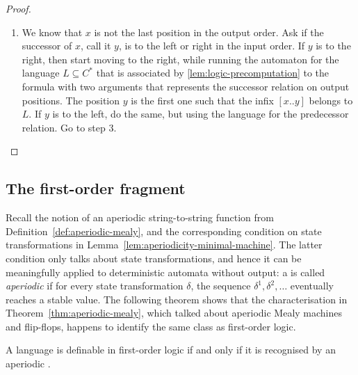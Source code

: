 \begin{proof}
\begin{enumerate}
        \item We know that $x$ is not the last position in the output order. Ask if the successor of $x$, call it $y$, is to the left or right in the input order. If $y$ is to the right, then start moving to the right, while running the automaton for the language $L \subseteq C^*$ that is associated  by \cref{lem:logic-precomputation} to the formula with two arguments that represents the successor relation on output positions. The position $y$ is the first one such that the infix $[x..y]$ belongs to $L$. If $y$ is to the left, do the same, but using the language  for the predecessor relation. Go to step 3. 
    \end{enumerate}

    
\end{proof}


\subsection{The first-order fragment}
\label{sec:logic-aperiodic}
\newcommand{\fotype}{\text{tp}}


Recall the notion of an aperiodic string-to-string function from Definition~\ref{def:aperiodic-mealy}, and the corresponding condition on state transformations in Lemma~\ref{lem:aperiodicity-minimal-machine}. The latter condition only talks about state transformations, and hence it  can be meaningfully applied to deterministic automata without output:  a \dfa is called \emph{aperiodic} if for every state transformation $\delta$, the sequence $\delta^1, \delta^2, \ldots$ eventually reaches a stable value. The following theorem shows that the characterisation in Theorem~\ref{thm:aperiodic-mealy}, which talked about aperiodic Mealy machines and flip-flops, happens to identify the same class as first-order logic.
\begin{theorem}
    \label{thm:logic-aperiodic}
    A language is definable in first-order logic if and only if it is recognised by an aperiodic \dfa.
\end{theorem}

